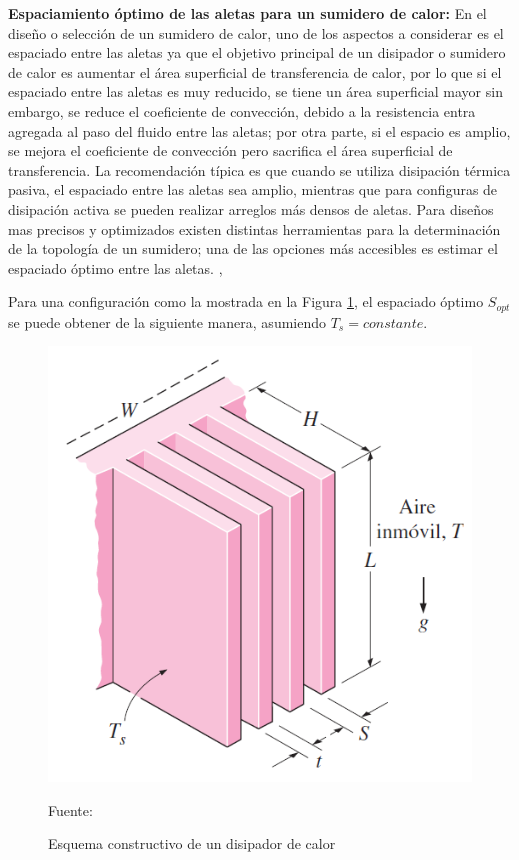 \textbf{Espaciamiento óptimo de las aletas para un sumidero de calor:} En el diseño o selección de un sumidero de calor, uno de los aspectos a considerar es el espaciado entre las aletas ya que el objetivo principal de un disipador o sumidero de calor es aumentar el área superficial de transferencia de calor, por lo que si el espaciado entre las aletas es muy reducido, se tiene un área superficial mayor sin embargo, se reduce el coeficiente de convección, debido a la resistencia entra  agregada al paso del fluido entre las aletas; por otra parte, si el espacio es amplio, se mejora el coeficiente de convección pero sacrifica el área superficial de transferencia\cite{cengel}. La recomendación típica es que cuando se utiliza disipación térmica pasiva, el espaciado entre las aletas sea amplio, mientras que para configuras de disipación activa se pueden realizar arreglos más densos de aletas. Para diseños mas precisos y optimizados existen distintas herramientas para la determinación de la topología de un sumidero; una de las opciones más accesibles es estimar el espaciado óptimo entre las aletas. \cite{cengel},\cite{topologia}

Para una configuración como la mostrada en la Figura \ref{ejemplo disipador}, el espaciado óptimo $S_{opt}$ se puede obtener de la siguiente manera, asumiendo $T_{s}=constante$. \cite{cengel}

\begin{figure}[H]
\centering
\includegraphics[scale=0.55]{Figuras/ejemplodisipador.png}
\caption{Esquema constructivo de un disipador de calor}
Fuente:\cite{cengel}
\label{ejemplo disipador}
\end{figure}

